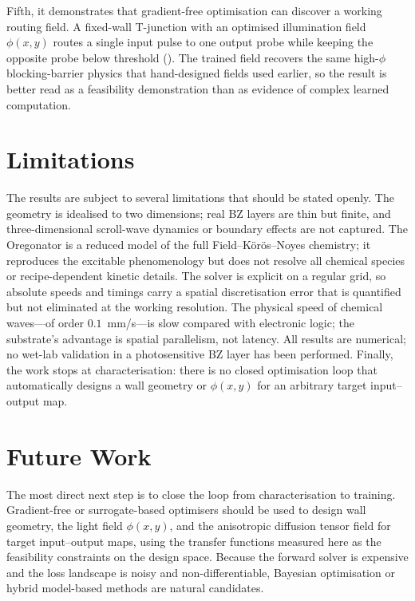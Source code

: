 Fifth, it demonstrates that gradient-free optimisation can discover a working routing field.
A fixed-wall T-junction with an optimised illumination field $\phi(x,y)$ routes a single input pulse to one output probe while keeping the opposite probe below threshold ().
The trained field recovers the same high-$\phi$ blocking-barrier physics that hand-designed fields used earlier, so the result is better read as a feasibility demonstration than as evidence of complex learned computation.

\section{Limitations}
\label{sec:conc_limitations}

The results are subject to several limitations that should be stated openly.
The geometry is idealised to two dimensions; real BZ layers are thin but finite, and three-dimensional scroll-wave dynamics or boundary effects are not captured.
The Oregonator is a reduced model of the full Field--K\"or\"os--Noyes chemistry; it reproduces the excitable phenomenology but does not resolve all chemical species or recipe-dependent kinetic details.
The solver is explicit on a regular grid, so absolute speeds and timings carry a spatial discretisation error that is quantified but not eliminated at the working resolution.
The physical speed of chemical waves---of order $0.1$~mm/s---is slow compared with electronic logic; the substrate's advantage is spatial parallelism, not latency.
All results are numerical; no wet-lab validation in a photosensitive BZ layer has been performed.
Finally, the work stops at characterisation: there is no closed optimisation loop that automatically designs a wall geometry or $\phi(x,y)$ for an arbitrary target input--output map.

\section{Future Work}
\label{sec:conc_future}

The most direct next step is to close the loop from characterisation to training.
Gradient-free or surrogate-based optimisers should be used to design wall geometry, the light field $\phi(x,y)$, and the anisotropic diffusion tensor field for target input--output maps, using the transfer functions measured here as the feasibility constraints on the design space.
Because the forward solver is expensive and the loss landscape is noisy and non-differentiable, Bayesian optimisation or hybrid model-based methods are natural candidates.

